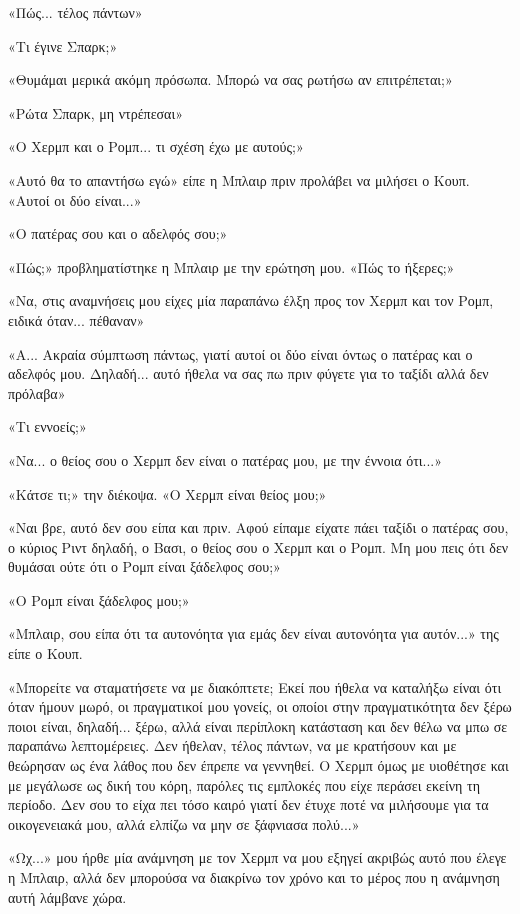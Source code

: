 \documentclass[12pt,twoside, openany]{book}
\begin{document}
«Πώς... τέλος πάντων»

«Τι έγινε Σπαρκ;»

«Θυμάμαι μερικά ακόμη πρόσωπα. Μπορώ να σας ρωτήσω αν επιτρέπεται;»

«Ρώτα Σπαρκ, μη ντρέπεσαι»

«Ο Χερμπ και ο Ρομπ... τι σχέση έχω με αυτούς;»

«Αυτό θα το απαντήσω εγώ» είπε η Μπλαιρ πριν προλάβει να μιλήσει ο Κουπ. «Αυτοί οι δύο είναι...»

«Ο πατέρας σου και ο αδελφός σου;»

«Πώς;» προβληματίστηκε η Μπλαιρ με την ερώτηση μου. «Πώς το ήξερες;»

«Να, στις αναμνήσεις μου είχες μία παραπάνω έλξη προς τον Χερμπ και τον Ρομπ, ειδικά όταν... πέθαναν»

«Α... Ακραία σύμπτωση πάντως, γιατί αυτοί οι δύο είναι όντως ο πατέρας και ο αδελφός μου. Δηλαδή... αυτό ήθελα να σας πω πριν φύγετε για το ταξίδι αλλά δεν πρόλαβα»

«Τι εννοείς;»

«Να... ο θείος σου ο Χερμπ δεν είναι ο πατέρας μου, με την έννοια ότι...»

«Κάτσε τι;» την διέκοψα. «Ο Χερμπ είναι θείος μου;»

«Ναι βρε, αυτό δεν σου είπα και πριν. Αφού είπαμε είχατε πάει ταξίδι ο πατέρας σου, ο κύριος Ριντ δηλαδή, ο Βασι, ο θείος σου ο Χερμπ και ο Ρομπ. Μη μου πεις ότι δεν θυμάσαι ούτε ότι ο Ρομπ είναι ξάδελφος σου;»

«Ο Ρομπ είναι ξάδελφος μου;»

«Μπλαιρ, σου είπα ότι τα αυτονόητα για εμάς δεν είναι αυτονόητα για αυτόν...» της είπε ο Κουπ.

«Μπορείτε να σταματήσετε να με διακόπτετε; Εκεί που ήθελα να καταλήξω είναι ότι όταν ήμουν μωρό, οι πραγματικοί μου γονείς, οι οποίοι στην πραγματικότητα δεν ξέρω ποιοι είναι, δηλαδή... ξέρω, αλλά είναι περίπλοκη κατάσταση και δεν θέλω να μπω σε παραπάνω λεπτομέρειες. Δεν ήθελαν, τέλος πάντων, να με κρατήσουν και με θεώρησαν ως ένα λάθος που δεν έπρεπε να γεννηθεί. Ο Χερμπ όμως με υιοθέτησε και με μεγάλωσε ως δική του κόρη, παρόλες τις εμπλοκές που είχε περάσει εκείνη τη περίοδο. Δεν σου το είχα πει τόσο καιρό γιατί δεν έτυχε ποτέ να μιλήσουμε για τα οικογενειακά μου, αλλά ελπίζω να μην σε ξάφνιασα πολύ...»

«Ωχ...» μου ήρθε μία ανάμνηση με τον Χερμπ να μου εξηγεί ακριβώς αυτό που έλεγε η Μπλαιρ, αλλά δεν μπορούσα να διακρίνω τον χρόνο και το μέρος που η ανάμνηση αυτή λάμβανε χώρα.
\end{document}
